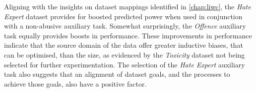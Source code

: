 Aligning with the insights on dataset mappings identified in \cref{chap:liwc}, the \textit{Hate Expert} dataset provides for boosted predicted power when used in conjunction with a non-abusive auxiliary task. 
Somewhat surprisingly, the \textit{Offence} auxiliary task equally provides boosts in performance.
These improvements in performance indicate that the source domain of the data offer greater inductive biases, that can be optimised, than the size, as evidenced by the \textit{Toxicity} dataset not being selected for further experimentation.
The selection of the \textit{Hate Expert} auxiliary task also suggests that an alignment of dataset goals, and the processes to achieve those goals, also have a positive factor.

\begin{table}[]
  \centering
\end{table}
